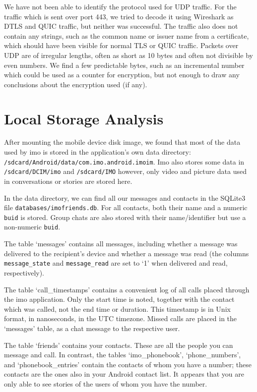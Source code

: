 \documentclass[conference]{IEEEtran}
\begin{document}
We have not been able to identify the protocol used for UDP traffic. For the
traffic which is sent over port 443, we tried to decode it using Wireshark as
DTLS and QUIC traffic, but neither was successful. The traffic also does not
contain any strings, such as the common name or issuer name from a certificate,
which should have been visible for normal TLS or QUIC traffic. Packets over UDP
are of irregular lengths, often as short as 10 bytes and often not divisible by
even numbers. We find a few predictable bytes, such as an incremental number
which could be used as a counter for encryption, but not enough to draw any
conclusions about the encryption used (if any).


\section{Local Storage Analysis}\label{sec:storage}

After mounting the mobile device disk image, we found that most of the data
used by imo is stored in the application's own data directory:
\texttt{/sdcard/Android/data/com.imo.android.imoim}. Imo also stores some data
in \texttt{/sdcard/DCIM/imo} and \texttt{/sdcard/IMO} however, only video and
picture data used in conversations or stories are stored here.

In the data directory, we can find all our messages and contacts in the SQLite3
file \texttt{databases/imofriends.db}. For all contacts, both their name and a
numeric \texttt{buid} is stored. Group chats are also stored with their
name/identifier but use a non-numeric \texttt{buid}.

The table `messages' contains all messages, including whether a message was
delivered to the recipient's device and whether a message was read (the columns
\texttt{message\_state} and \texttt{message\_read} are set to `1' when
delivered and read, respectively).

The table `call\_timestamps' contains a convenient log of all calls placed
through the imo application. Only the start time is noted, together with the
contact which was called, not the end time or duration. This timestamp is in
Unix format, in nanoseconds, in the UTC timezone. Missed calls are placed in
the `messages' table, as a chat message to the respective user.

The table `friends' contains your contacts. These are all the people you can
message and call. In contrast, the tables `imo\_phonebook', `phone\_numbers',
and `phonebook\_entries' contain the contacts of whom you have a number; these
contacts are the ones also in your Android contact list. It appears that you
are only able to see stories of the users of whom you have the number.
\end{document}
